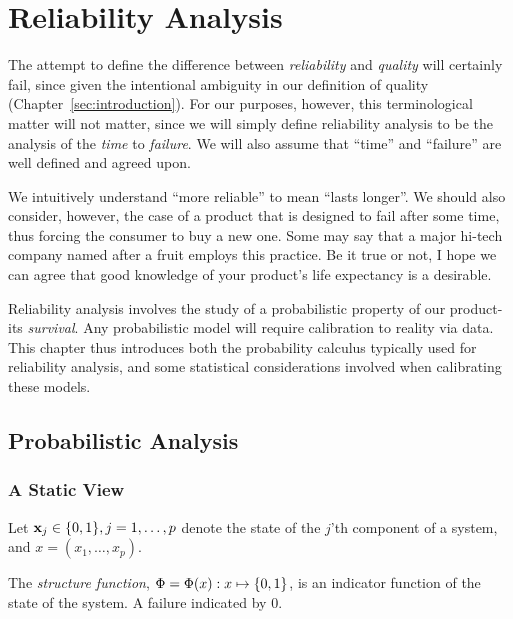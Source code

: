 \chapter{Reliability Analysis}

The attempt to define the difference between \emph{reliability} and \emph{quality} will certainly fail, since given the intentional ambiguity in our definition of quality (Chapter~\ref{sec:introduction}).
For our purposes, however, this terminological matter will not matter, since we will simply define reliability analysis to be the analysis of the \emph{time} to \emph{failure}.
We will also assume that ``time'' and ``failure'' are well defined and agreed upon.

We intuitively understand ``more reliable'' to mean ``lasts longer''. 
We should also consider, however, the case of a product that is designed to fail after some time, thus forcing the consumer to buy a new one. 
Some may say that a major hi-tech company named after a fruit employs this practice. 
Be it true or not, I hope we can agree that good knowledge of your product's life expectancy is a desirable. 

Reliability analysis involves the study of a probabilistic property of our product- its \emph{survival}.
Any probabilistic model will require calibration to reality via data. 
This chapter thus introduces both the probability calculus typically used for reliability analysis, and some statistical considerations involved when calibrating these models.



\section{Probabilistic Analysis}




\subsection{A Static View}

Let $\mathbf{x}_j \in \{ 0,1 \}, j=1,\dots,p$ denote the state of the $j$'th component of a system, and $x=(x_1,\dots,x_p)$.

\begin{definition}
The \emph{structure function}, $\Phi=\Phi(x):x \mapsto \{ 0,1 \}$, is an indicator function of the state of the system. A failure indicated by $0$. 
\end{definition}

